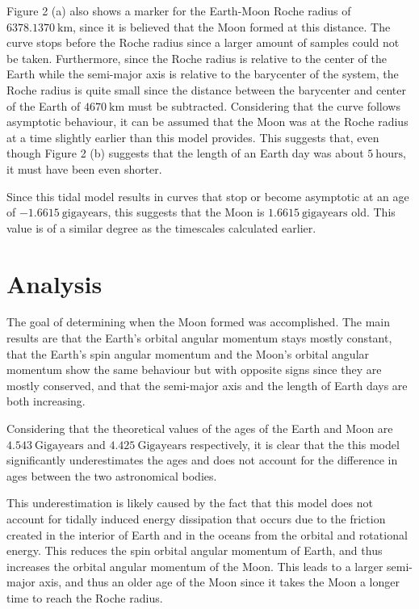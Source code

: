 \documentclass[12pt]{article}
\begin{document}
Figure 2 (a) also shows a marker for the Earth-Moon Roche radius of $6378.1370 \ \text{km}$, since it is believed that the Moon formed at this distance. The curve stops before the Roche radius since a larger amount of samples could not be taken. Furthermore, since the Roche radius is relative to the center of the Earth while the semi-major axis is relative to the barycenter of the system, the Roche radius is quite small since the distance between the barycenter and center of the Earth of $4670 \ \text{km}$ must be subtracted. Considering that the curve follows asymptotic behaviour, it can be assumed that the Moon was at the Roche radius at a time slightly earlier than this model provides. This suggests that, even though Figure 2 (b) suggests that the length of an Earth day was about $5 \ \text{hours}$, it must have been even shorter.

Since this tidal model results in curves that stop or become asymptotic at an age of $-1.6615 \ \text{gigayears}$, this suggests that the Moon is $1.6615 \ \text{gigayears}$ old. This value is of a similar degree as the timescales calculated earlier.

\section{Analysis}
The goal of determining when the Moon formed was accomplished. The main results are that the Earth's orbital angular momentum stays mostly constant, that the Earth's spin angular momentum and the Moon's orbital angular momentum show the same behaviour but with opposite signs since they are mostly conserved, and that the semi-major axis and the length of Earth days are both increasing.

Considering that the theoretical values of the ages of the Earth and Moon are $4.543 \ \text{Gigayears}$ and $4.425 \ \text{Gigayears}$ respectively, it is clear that the this model significantly underestimates the ages and does not account for the difference in ages between the two astronomical bodies. 

This underestimation is likely caused by the fact that this model does not account for tidally induced energy dissipation that occurs due to the friction created in the interior of Earth and in the oceans from the orbital and rotational energy. This reduces the spin orbital angular momentum of Earth, and thus increases the orbital angular momentum of the Moon. This leads to a larger semi-major axis, and thus an older age of the Moon since it takes the Moon a longer time to reach the Roche radius.
\end{document}

